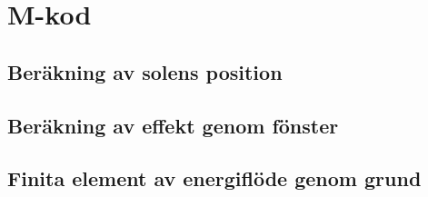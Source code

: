 \newpage
\chapter{M-kod}
\label{sec:mcode}


\section{Beräkning av solens position}\label{app:sunposition}



\section{Beräkning av effekt genom fönster}\label{app:sunwindows}






\section{Finita element av energiflöde genom grund}\label{app:femfoundation}






